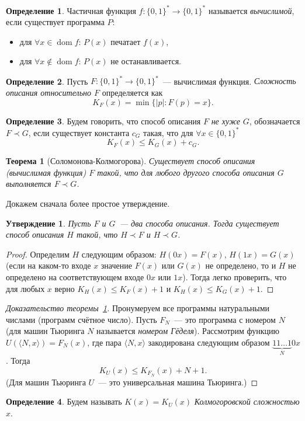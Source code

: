 \documentclass[12pt]{article}
\newcommand{\binstr}{\{0,1\}^*}
\DeclareMathOperator{\dom}{dom}
\theoremstyle{definition}
\newtheorem{definition}{Определение}
\theoremstyle{plain}
\newtheorem{theorem}{Теорема}[section]
\newtheorem{statement}{Утверждение}[section]
\theoremstyle{remark}
\begin{document}
\begin{definition}
    Частичная функция $f:\binstr\to\binstr$ называется \emph{вычислимой}, если
    существует программа $P$:
    \begin{itemize}
        \item для $\forall x    \in\dom f$: $P(x)$ печатает $f(x)$,
        \item для $\forall x\not\in\dom f$: $P(x)$ не останавливается.
    \end{itemize}
\end{definition}
\begin{definition}
    Пусть $F:\binstr\to\binstr$~--- вычислимая функция. \emph{Сложность описания 
    относительно $F$} определяется как \[K_F(x) = \min\{|p| : F(p) = x\}.\]
\end{definition}
\begin{definition}
    Будем говорить, что способ описания $F$ \emph{не хуже} $G$, обозначается
    $F\prec G$, если существует константа $c_G$ такая, что для $\forall x\in\binstr$ 
    \[K_F(x) \le K_G(x) + c_G.\]
\end{definition}
\begin{theorem}[Соломонова-Колмогорова]\label{thm:solomonov-kolmogorov}
    Существует способ описания (вычислимая функция) $F$ такой, что для любого
    другого способа описания $G$ выполняется $F\prec G$.  
\end{theorem}
Докажем сначала более простое утверждение.
\begin{statement}
    Пусть $F$ и $G$~— два способа описания. Тогда существует способ описания $H$ 
    такой, что $H\prec F$ и $H\prec G$.
\end{statement}
\begin{proof}
    Определим $H$ следующим образом: $H(0x) = F(x)$, $H(1x) = G(x)$ (если
    на каком-то входе $x$ значение $F(x)$ или $G(x)$ не определено, то и $H$ не определено на
    соответствующем входе $0x$ или $1x$). Тогда легко
    проверить, что для любых $x$ верно $K_H(x)\le K_F(x) + 1$ и $K_H(x)\le K_G(x) + 1$.
\end{proof}
\begin{proof}[Доказательство теоремы~\ref{thm:solomonov-kolmogorov}]
    Пронумеруем все программы натуральными числами (программ счётное число). Пусть $F_N$~— 
    это программа с номером $N$ (для машин Тьюринга $N$ называется \emph{номером Гёделя}). 
    Рассмотрим функцию $U(\langle N, x\rangle) = F_N(x)$, где пара $\langle
    N,x\rangle$ закодирована следующим образом $\underbrace{11\dots1}_{N}0x$.
    Тогда 
    \[
        K_U(x)\le K_{F_N}(x) + N + 1.
    \]
    (Для машин Тьюринга $U$~--- это универсальная машина Тьюринга.)
\end{proof}
\begin{definition}
    Будем называть $K(x) = K_U(x)$ \emph{Колмогоровской сложностью $x$}.
\end{definition}
\end{document}
